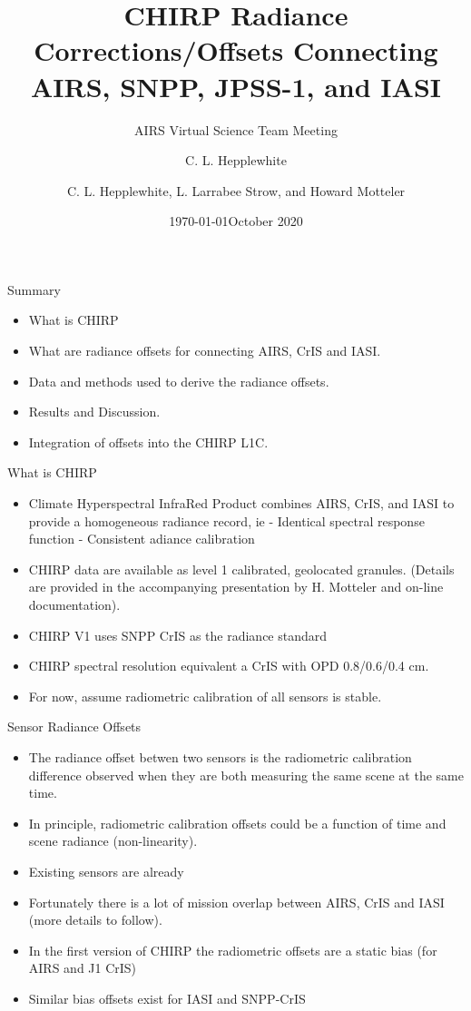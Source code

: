 \documentclass[10pt,t]{beamer}
\author{C. L. Hepplewhite}
\date{\today}
\title{\large CHIRP Radiance Corrections/Offsets Connecting AIRS, SNPP, JPSS-1, and IASI}
\subtitle{\footnotesize{AIRS Virtual Science Team Meeting}}
\date{\vspace{0.1in}\footnotesize{October 2020 \vfill}}
\author{C. L. Hepplewhite\inst{1,2}, L. Larrabee Strow\inst{1,2}, and Howard Motteler\inst{2} }
\institute[UMBC]{\inst{1} UMBC Physics Dept. \and \inst{2}UMBC JCET}
\begin{document}
\maketitle

\begin{frame}{Summary}
\begin{itemize}
  \item What is CHIRP
  \item What are radiance offsets for connecting AIRS, CrIS and IASI.
  \item Data and methods used to derive the radiance offsets.
  \item Results and Discussion.
  \item Integration of offsets into the CHIRP L1C.
    
\end{itemize}

\end{frame}
\begin{frame}{What is CHIRP}

  \begin{itemize}
  \item Climate Hyperspectral InfraRed Product combines AIRS, CrIS, and IASI to provide a homogeneous radiance record, ie
    -  Identical spectral response function
    -  Consistent adiance calibration
  \item CHIRP data are available as level 1 calibrated, geolocated granules.
    (Details are provided in the accompanying presentation by H. Motteler and on-line documentation).
  \item CHIRP V1 uses SNPP CrIS as the radiance standard
  \item CHIRP spectral resolution equivalent a CrIS with OPD 0.8/0.6/0.4 cm.  
  \item For now, assume radiometric calibration of all sensors is stable.
  \end{itemize}
  

\end{frame}
\begin{frame}{Sensor Radiance Offsets}

  \begin{itemize}
  \item The radiance offset betwen two sensors is the radiometric calibration
    difference observed when they are both measuring the same scene at the same time.
  \item In principle, radiometric calibration offsets could be a function of time and scene radiance (non-linearity).
  \item Existing sensors are already 
  \item Fortunately there is a lot of mission overlap between AIRS, CrIS and IASI
    (more details to follow).
  \item In the first version of CHIRP the radiometric offsets are a static bias (for AIRS and J1 CrIS)
  \item Similar bias offsets exist for IASI and SNPP-CrIS 
  \end{itemize}

\end{frame}
\end{document}
